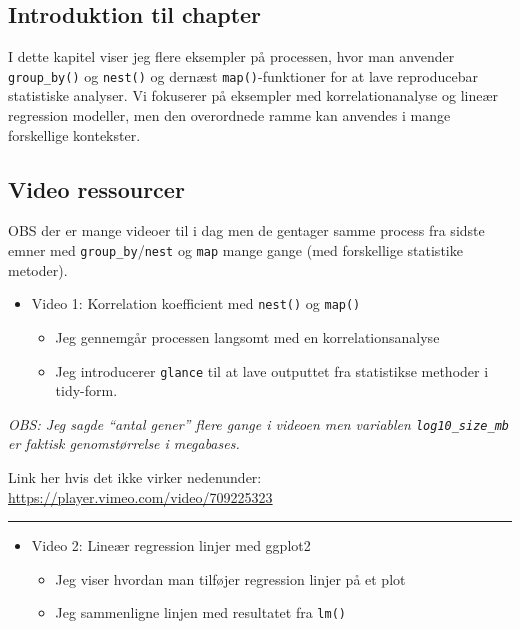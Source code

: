 \documentclass[
]{book}
\providecommand{\tightlist}{%
  \setlength{\itemsep}{0pt}\setlength{\parskip}{0pt}}
\begin{document}
\hypertarget{introduktion-til-chapter}{%
\subsection{Introduktion til chapter}\label{introduktion-til-chapter}}

I dette kapitel viser jeg flere eksempler på processen, hvor man anvender \texttt{group\_by()} og \texttt{nest()} og dernæst \texttt{map()}-funktioner for at lave reproducebar statistiske analyser. Vi fokuserer på eksempler med korrelationanalyse og lineær regression modeller, men den overordnede ramme kan anvendes i mange forskellige kontekster.

\hypertarget{video-ressourcer-4}{%
\subsection{Video ressourcer}\label{video-ressourcer-4}}

OBS der er mange videoer til i dag men de gentager samme process fra sidste emner med \texttt{group\_by}/\texttt{nest} og \texttt{map} mange gange (med forskellige statistike metoder).

\begin{itemize}
\tightlist
\item
  Video 1: Korrelation koefficient med \texttt{nest()} og \texttt{map()}

  \begin{itemize}
  \tightlist
  \item
    Jeg gennemgår processen langsomt med en korrelationsanalyse
  \item
    Jeg introducerer \texttt{glance} til at lave outputtet fra statistikse methoder i tidy-form.
  \end{itemize}
\end{itemize}

\emph{OBS: Jeg sagde ``antal gener'' flere gange i videoen men variablen \texttt{log10\_size\_mb} er faktisk genomstørrelse i megabases.}

Link her hvis det ikke virker nedenunder: \url{https://player.vimeo.com/video/709225323}

\begin{center}\rule{0.5\linewidth}{0.5pt}\end{center}

\begin{itemize}
\tightlist
\item
  Video 2: Lineær regression linjer med ggplot2

  \begin{itemize}
  \tightlist
  \item
    Jeg viser hvordan man tilføjer regression linjer på et plot
  \item
    Jeg sammenligne linjen med resultatet fra \texttt{lm()}
  \end{itemize}
\end{itemize}
\end{document}
